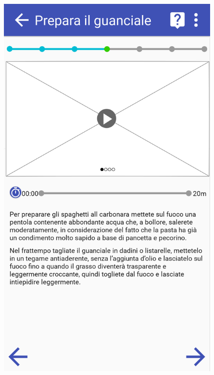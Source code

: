 \begin{figure}[H]
\begin{minipage}{.49\textwidth}
		\includegraphics[width=\textwidth]{img/wireframe/presentazione_passo_ricetta_timer_non_attivo.png}
	\end{minipage}
\end{figure}

